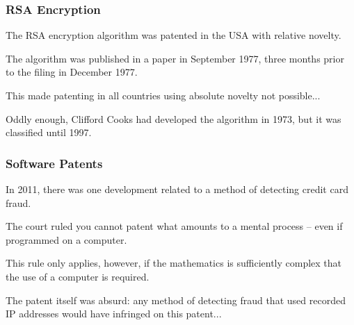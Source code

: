 \begin{frame}
\frametitle{RSA Encryption}

The RSA encryption algorithm was patented in the USA with relative novelty.

The algorithm was published in a paper in September 1977, three months prior to the filing in December 1977.


This made patenting in all countries using absolute novelty not possible...

Oddly enough, Clifford Cooks had developed the algorithm in 1973, but it was classified until 1997.

\end{frame}



\begin{frame}
\frametitle{Software Patents}

In 2011, there was one development related to a method of detecting credit card fraud.

The court ruled you cannot patent what amounts to a mental process -- even if programmed on a computer.

This rule only applies, however, if the mathematics is sufficiently complex that the use of a computer is required.

The patent itself was absurd: any method of detecting fraud that used recorded IP addresses would have infringed on this patent...


\end{frame}




